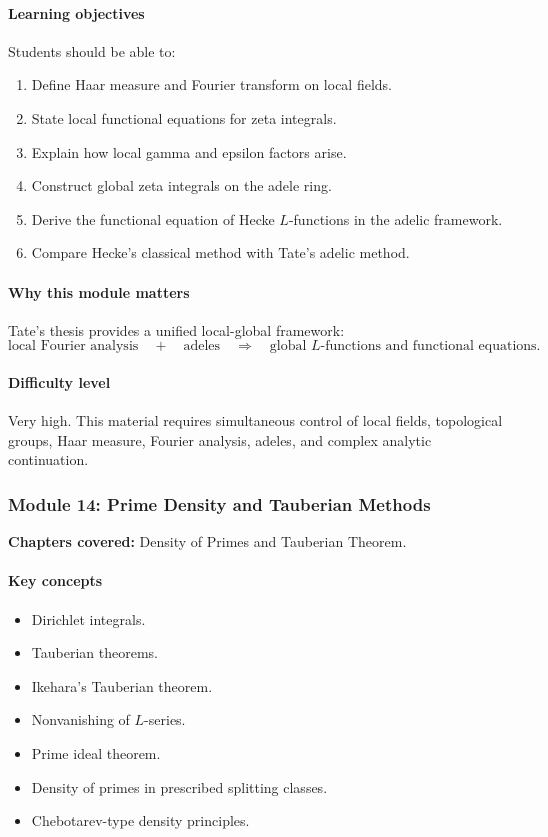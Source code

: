 \documentclass[11pt]{article}
\begin{document}
\paragraph{Learning objectives}
Students should be able to:
\begin{enumerate}
    \item Define Haar measure and Fourier transform on local fields.
    \item State local functional equations for zeta integrals.
    \item Explain how local gamma and epsilon factors arise.
    \item Construct global zeta integrals on the adele ring.
    \item Derive the functional equation of Hecke $L$-functions in the adelic framework.
    \item Compare Hecke's classical method with Tate's adelic method.
\end{enumerate}

\paragraph{Why this module matters}
Tate's thesis provides a unified local-global framework:
\[
\text{local Fourier analysis}
\quad+\quad
\text{adeles}
\quad\Longrightarrow\quad
\text{global }L\text{-functions and functional equations}.
\]

\paragraph{Difficulty level}
Very high. This material requires simultaneous control of local fields, topological groups, Haar measure, Fourier analysis, adeles, and complex analytic continuation.

\subsubsection*{Module 14: Prime Density and Tauberian Methods}

\textbf{Chapters covered:} Density of Primes and Tauberian Theorem.

\paragraph{Key concepts}
\begin{itemize}
    \item Dirichlet integrals.
    \item Tauberian theorems.
    \item Ikehara's Tauberian theorem.
    \item Nonvanishing of $L$-series.
    \item Prime ideal theorem.
    \item Density of primes in prescribed splitting classes.
    \item Chebotarev-type density principles.
\end{itemize}
\end{document}

